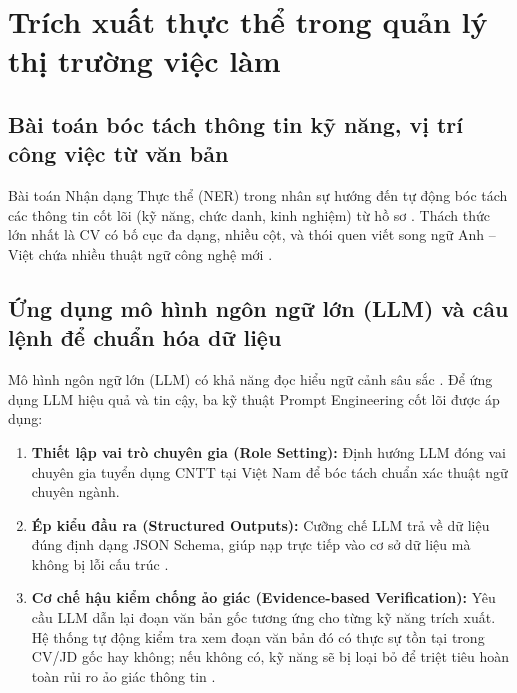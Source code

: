\section{Trích xuất thực thể trong quản lý thị trường việc làm}

\subsection{Bài toán bóc tách thông tin kỹ năng, vị trí công việc từ văn bản}

Bài toán Nhận dạng Thực thể (NER) trong nhân sự hướng đến tự động bóc tách các thông tin cốt lõi (kỹ năng, chức danh, kinh nghiệm) từ hồ sơ \cite{li2020competence}. Thách thức lớn nhất là CV có bố cục đa dạng, nhiều cột, và thói quen viết song ngữ Anh -- Việt chứa nhiều thuật ngữ công nghệ mới \cite{li2020competence}.

\subsection{Ứng dụng mô hình ngôn ngữ lớn (LLM) và câu lệnh để chuẩn hóa dữ liệu}

Mô hình ngôn ngữ lớn (LLM) có khả năng đọc hiểu ngữ cảnh sâu sắc \cite{geministructured}. Để ứng dụng LLM hiệu quả và tin cậy, ba kỹ thuật Prompt Engineering cốt lõi được áp dụng:

\begin{enumerate}
    \item \textbf{Thiết lập vai trò chuyên gia (Role Setting):} Định hướng LLM đóng vai chuyên gia tuyển dụng CNTT tại Việt Nam để bóc tách chuẩn xác thuật ngữ chuyên ngành.
    \item \textbf{Ép kiểu đầu ra (Structured Outputs):} Cưỡng chế LLM trả về dữ liệu đúng định dạng JSON Schema, giúp nạp trực tiếp vào cơ sở dữ liệu mà không bị lỗi cấu trúc \cite{geministructured}.
    \item \textbf{Cơ chế hậu kiểm chống ảo giác (Evidence-based Verification):} Yêu cầu LLM dẫn lại đoạn văn bản gốc tương ứng cho từng kỹ năng trích xuất. Hệ thống tự động kiểm tra xem đoạn văn bản đó có thực sự tồn tại trong CV/JD gốc hay không; nếu không có, kỹ năng sẽ bị loại bỏ để triệt tiêu hoàn toàn rủi ro ảo giác thông tin \cite{geministructured}.
\end{enumerate}
